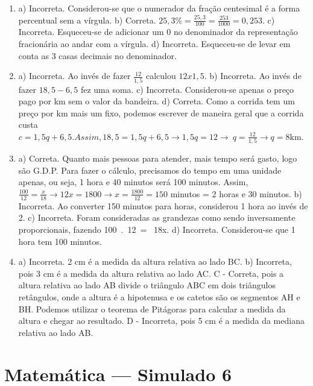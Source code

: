 \begin{enumerate}
\item a) Incorreta. Considerou-se que o numerador da fração centesimal é a forma percentual sem a vírgula.
b) Correta.
$25,3\% = \frac{25,3}{100} = \frac{253}{1000} = 0,253$.
c) Incorreta. Esqueceu-se de adicionar um 0 no denominador da representação fracionária ao andar com a vírgula.
d) Incorreta. Esqueceu-se de levar em conta as 3 casas decimais no denominador.


\item a) Incorreta. Ao invés de fazer $\frac{12}{1,5}$ calculou $12 x
1,5$. 
b) Incorreta. Ao invés de fazer $18,5 - 6,5$ fez uma soma. 
c) Incorreta. Considerou-se apenas o preço pago por km sem o valor da bandeira. 
d) Correta. Como a corrida tem um preço por km mais um
fixo, podemos escrever de maneira geral que a corrida custa
$c = 1,5q + 6,5. Assim, 18,5 = 1,5q + 6,5 \rightarrow 1,5q = 12 \rightarrow \ q = \frac{12}{1,5} \rightarrow q = 8\text{km}$.


\item a) Correta. Quanto mais pessoas para atender, mais tempo será gasto, logo são G.D.P. Para fazer o cálculo, precisamos do tempo em uma
unidade apenas, ou seja, 1 hora e 40 minutos será 100 minutos. Assim, $\frac{100}{12} = \frac{x}{18} \rightarrow 12x = 1800 \rightarrow x = \frac{1800}{12} = 150$ minutos = 2 horas e 30 minutos. 
b) Incorreta. Ao converter 150 minutos para horas, considerou 1 hora ao invés de 2. 
c) Incorreta. Foram consideradas as grandezas como sendo inversamente proporcionais, fazendo 100\ .\ 12\  = \ 18x. 
d) Incorreta. Considerou-se que 1 hora tem 100 minutos.


\item a) Incorreta. 2 cm é a medida da altura relativa ao lado BC.
b) Incorreta, pois 3 cm é a medida da altura relativa ao lado AC.
C - Correta, pois a altura relativa ao lado AB divide o triângulo ABC em
dois triângulos retângulos, onde a altura é a hipotenusa e os catetos
são os segmentos AH e BH. Podemos utilizar o teorema de Pitágoras para
calcular a medida da altura e chegar ao resultado.
D - Incorreta, pois 5 cm é a medida da mediana relativa ao lado AB.
\end{enumerate}

\section*{Matemática — Simulado 6} 

